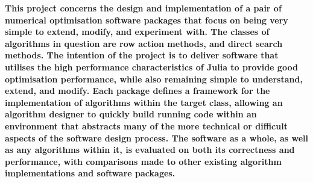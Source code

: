 \vspace*{\fill}
\textbf{
This project concerns the design and implementation of a pair of numerical optimisation software packages that focus on being very simple to extend, modify, and experiment with. The classes of algorithms in question are row action methods, and direct search methods. The intention of the project is to deliver software that utilises the high performance characteristics of Julia to provide good optimisation performance, while also remaining simple to understand, extend, and modify. Each package defines a framework for the implementation of algorithms within the target class, allowing an algorithm designer to quickly build running code within an environment that abstracts many of the more technical or difficult aspects of the software design process. The software as a whole, as well as any algorithms within it, is evaluated on both its correctness and performance, with comparisons made to other existing algorithm implementations and software packages.}
\vspace*{\fill}